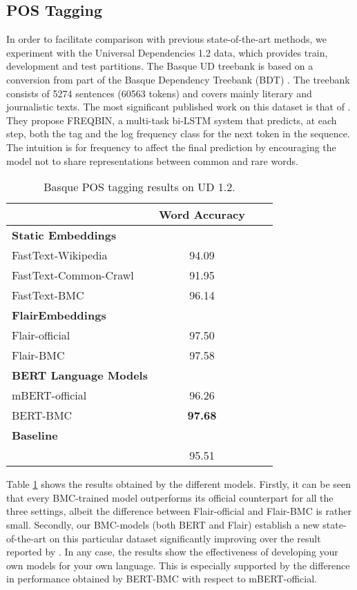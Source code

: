 \documentclass[10pt, a4paper]{article}
\begin{document}
\subsection{POS Tagging}\label{sec:pos-tagging}

In order to facilitate comparison with previous state-of-the-art methods, we experiment with the Universal Dependencies 1.2 data, which provides train, development and test partitions. The Basque UD treebank \cite{aranzabe2015automatic} is based on a conversion from part of the Basque Dependency Treebank (BDT) \cite{aduriz2003construction}. The treebank consists of 5274 sentences (60563 tokens) and covers mainly literary and journalistic texts. The most significant published work on this dataset is that of \cite{plank-etal-2016-multilingual}. They propose FREQBIN, a multi-task bi-LSTM system that predicts, at each step, both the tag and the log frequency class for the next token in the sequence. The intuition is for frequency to affect the final prediction by encouraging the model not to share representations between common and rare words.

\begin{table}[!t]\footnotesize
\centering
\begin{tabular}{@{\hspace{0.3cm}}lccc} \hline
 \textbf{} & \textbf{Word Accuracy} \\ \hline
\textbf{Static Embeddings} & \\
FastText-Wikipedia & 94.09 \\
FastText-Common-Crawl & 91.95 \\
FastText-BMC  & 96.14 \\ \hline
\textbf{FlairEmbeddings} \\
Flair-official & 97.50 \\
Flair-BMC  &  97.58 \\ \hline
\textbf{BERT Language Models}\\
mBERT-official &  96.26 \\
BERT-BMC & \textbf{97.68} \\ \hline
\textbf{Baseline} \\
\cite{plank-etal-2016-multilingual} & 95.51 \\ \hline
\end{tabular}
\caption{Basque POS tagging results on UD 1.2.}\label{tab:pos}
\end{table}

Table \ref{tab:pos} shows the results obtained by the different models. Firstly, it can be seen that every BMC-trained model outperforms its official counterpart for all the three settings, albeit the difference between Flair-official and Flair-BMC is rather small. Secondly, our BMC-models (both BERT and Flair) establish a new state-of-the-art on this particular dataset significantly improving over the result reported by \cite{plank-etal-2016-multilingual}. In any case, the results show the effectiveness of developing your own models for your own language. This is especially supported by the difference in performance obtained by BERT-BMC with respect to mBERT-official.
\end{document}
